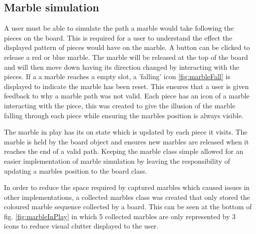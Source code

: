 \documentclass{l4proj}
\begin{document}
\subsection{Marble simulation}
A user must be able to simulate the path a marble would take following the pieces on the board. This is required for a user to understand the effect the displayed pattern of pieces would have on the marble. A button can be clicked to release a red or blue marble. The marble will be released at the top of the board and will then move down having its direction changed by interacting with the pieces. If a a marble reaches a empty slot, a 'falling' icon \ref{fig:marbleFall} is displayed to indicate the marble has been reset. This ensures that a user is given feedback to why a marble path was not valid. Each piece has an icon of a marble interacting with the piece, this was created to give the illusion of the marble falling through each piece while ensuring the marbles position is always visible.

The marble in play has its on state which is updated by each piece it visits. The marble is held by the board object and ensures new marbles are released when it reaches the end of a valid path. Keeping the marble class simple allowed for an easier implementation of marble simulation by leaving the responsibility of updating a marbles position to the board class. 


In order to reduce the space required by captured marbles which caused issues in other implementations, a collected marbles class was created that only stored the coloured marble sequence collected by a board. This can be seen at the bottom of fig. \ref{fig:marbleInPlay} in which 5 collected marbles are only represented by 3 icons to reduce visual clutter displayed to the user.
\end{document}
